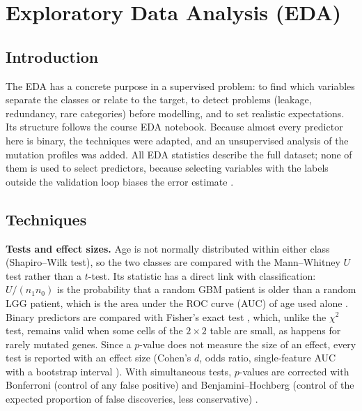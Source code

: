 \section{Exploratory Data Analysis (EDA)}\label{sec:prdl-eda}

\subsection{Introduction}

The EDA has a concrete purpose in a supervised problem: to find which variables separate the
classes or relate to the target, to detect problems (leakage, redundancy, rare categories) before
modelling, and to set realistic expectations. Its structure follows the course EDA notebook. Because
almost every predictor here is binary, the techniques were adapted, and an unsupervised analysis of
the mutation profiles was added. All EDA statistics describe the full dataset; none of them is used
to select predictors, because selecting variables with the labels outside the validation loop biases
the error estimate \cite{ambroise2002}.

\subsection{Techniques}

\textbf{Tests and effect sizes.} Age is not normally distributed within either class (Shapiro--Wilk
test), so the two classes are compared with the Mann--Whitney $U$ test \cite{mann1947} rather than
a $t$-test. Its statistic has a direct link with classification: $U/(n_1 n_0)$ is the probability
that a random GBM patient is older than a random LGG patient, which is the area under the ROC curve
(AUC) of age used alone \cite{hanley1982}. Binary predictors are compared with Fisher's exact test
\cite{fisher1922}, which, unlike the $\chi^2$ test, remains valid when some cells of the $2\times2$
table are small, as happens for rarely mutated genes. Since a $p$-value does not measure the size of
an effect, every test is reported with an effect size (Cohen's $d$, odds ratio, single-feature AUC
with a bootstrap interval \cite{efron1993}). With \NTests{} simultaneous tests, $p$-values are
corrected with Bonferroni (control of any false positive) and Benjamini--Hochberg (control of the
expected proportion of false discoveries, less conservative) \cite{benjamini1995}.

